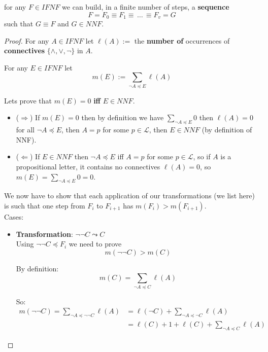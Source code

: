 	\begin{lemma} for any $F \in IFNF$ we can build, in a finite number of steps, a \textbf{sequence}
	$$ F = F_0 \equiv F_1 \equiv \, \dots \, \equiv F_v = G $$
	such that $G \equiv F$ and $G \in NNF$.
	\end{lemma}
	\begin{proof}

	For any $A \in IFNF$ let $\ell(A) :=$ the \textbf{number of} occurrences of \textbf{connectives} $\{\wedge, \vee, \neg\}$ in $A$.

	\newpage

	\noindent
	For any $E \in IFNF$ let
	$$m (E):= \sum_{\neg A \preceq E} \ell(A)$$

	\noindent
	Lets prove that $m(E) = 0$ \textbf{iff} $E \in NNF$.

	  \begin{itemize}
		\item ($\Rightarrow$) If $m(E) = 0$ then by definition we have $\sum_{\neg A \preceq E} 0$ then $\ell(A) = 0$ for all $\neg A \preceq E$, then $A = p$ for some $p \in \mathcal{L}$, then $E \in NNF$ (by definition of NNF).

		\item ($\Leftarrow$) If $E \in NNF$ then $\neg A \preceq E$ iff $A = p$ for some $p \in \mathcal{L}$, so if $A$ is a propositional letter, it contains no connectives $\ell (A) = 0$, so $m(E) = \sum_{\neg A \preceq E} 0 = 0$.
	  \end{itemize}

	We now have to show that each application of our transformations (we list here) is such that one step from $F_i$ to $F_{i+1}$ has $m(F_i) > m(F_{i+1})$.\\

	\noindent
	Cases:
	\begin{itemize}
		\item \textbf{Transformation}: $\neg \neg C \leadsto C$ \\
		Using $\neg \neg C \preceq F_i$ we need to prove
		$$ m(\neg \neg C) > m(C) $$

		By definition:
		$$m(C) = \sum_{\neg A \preceq C} \ell(A)$$

		So:
		\begin{align*}
		  m(\neg \neg C) = \sum_{\neg A \preceq \neg \neg C} \ell(A) &= \ell (\neg C) + \sum_{\neg A \preceq \neg C} \ell (A) \\
		  &= \ell (C) + 1 + \ell (C) + \sum_{\neg A \preceq C} \ell (A)
		\end{align*}


\end{itemize}
\end{proof}
